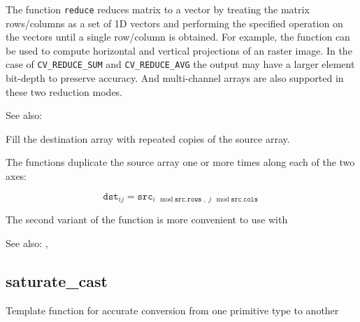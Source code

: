 The function \texttt{reduce} reduces matrix to a vector by treating the matrix rows/columns as a set of 1D vectors and performing the specified operation on the vectors until a single row/column is obtained. For example, the function can be used to compute horizontal and vertical projections of an raster image. In the case of \texttt{CV\_REDUCE\_SUM} and \texttt{CV\_REDUCE\_AVG} the output may have a larger element bit-depth to preserve accuracy. And multi-channel arrays are also supported in these two reduction modes. 

See also: 

Fill the destination array with repeated copies of the source array.

\begin{description}
\end{description}

The functions  duplicate the source array one or more times along each of the two axes:

\[\texttt{dst}_{ij}=\texttt{src}_{i\mod\texttt{src.rows},\;j\mod\texttt{src.cols}}\]

The second variant of the function is more convenient to use with 

See also: , 

\ifplastex
{}\label{cppfunc.saturatecast}
\else
\subsection{saturate\_cast}\label{cppfunc.saturatecast}
\fi
Template function for accurate conversion from one primitive type to another


